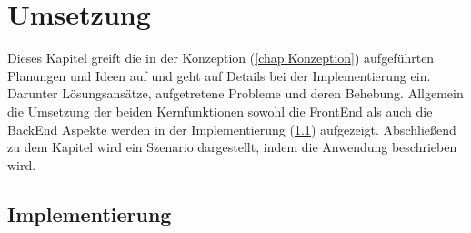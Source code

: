 

\chapter{Umsetzung}
\label{chap:Umsetzung}
Dieses Kapitel greift die in der Konzeption (\ref{chap:Konzeption}) aufgeführten Planungen und Ideen auf und geht auf Details bei der 
Implementierung ein. Darunter Lösungsansätze, aufgetretene Probleme und deren Behebung. Allgemein die Umsetzung der beiden Kernfunktionen 
sowohl die FrontEnd als auch die BackEnd Aspekte werden in der Implementierung (\ref{chap:implementierung}) aufgezeigt. Abschließend zu 
dem Kapitel wird ein Szenario dargestellt, indem die Anwendung beschrieben wird.

\section{Implementierung}
\label{chap:implementierung}
